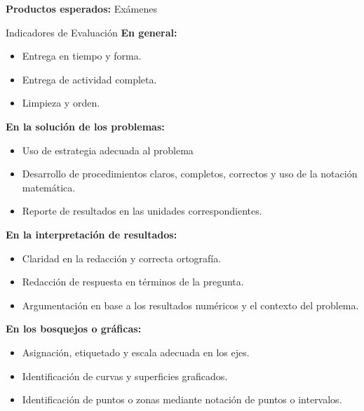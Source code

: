 \documentclass[11pt]{article}
\begin{document}
\begin{tcolorbox}
	\textbf{Productos esperados:}
	Exámenes
	\begin{mybox}{Indicadores de Evaluación}
		\textbf{En general:}
		\begin{itemize}
			\setlength{\itemsep}{0pt}
			\setlength{\parskip}{0pt}
			\item Entrega en tiempo y forma.
			\item Entrega de actividad completa.
			\item Limpieza y orden.			
		\end{itemize}
		\textbf{En la solución de los problemas:}
		\begin{itemize}
			\setlength{\itemsep}{0pt}
			\setlength{\parskip}{0pt}
			\item Uso de estrategia adecuada al problema
			\item Desarrollo de procedimientos claros, completos, correctos y uso de la notación matemática.
			\item Reporte de resultados en las unidades correspondientes.	
		\end{itemize}
		\textbf{En la interpretación de resultados:}
		\begin{itemize}
			\setlength{\itemsep}{0pt}
			\setlength{\parskip}{0pt}
			\item Claridad en la redacción y correcta ortografía.
			\item Redacción de respuesta en términos de la pregunta.
			\item Argumentación en base a los resultados numéricos y el contexto del problema.
		\end{itemize}
		\textbf{En los bosquejos o gráficas:}
		\begin{itemize}
			\setlength{\itemsep}{0pt}
			\setlength{\parskip}{0pt}
			\item Asignación, etiquetado y escala adecuada en los ejes.
			\item Identificación de curvas y superficies graficados.
			\item Identificación de puntos o zonas mediante notación de puntos o intervalos.
		\end{itemize}
	\end{mybox}

\end{tcolorbox}
\end{document}
